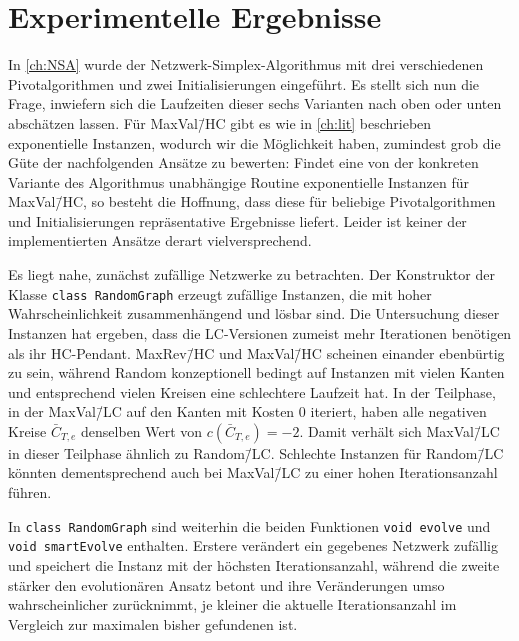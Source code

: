 \chapter{Experimentelle Ergebnisse}\label{ch:erg}
In \cref{ch:NSA} wurde der Netzwerk-Simplex-Algorithmus mit drei verschiedenen Pivotalgorithmen und zwei Initialisierungen eingeführt. Es stellt sich nun die Frage, inwiefern sich die Laufzeiten dieser sechs Varianten nach oben oder unten abschätzen lassen. Für MaxVal\=/HC gibt es wie in \cref{ch:lit} beschrieben exponentielle Instanzen, wodurch wir die Möglichkeit haben, zumindest grob die Güte der nachfolgenden Ansätze zu bewerten: Findet eine von der konkreten Variante des Algorithmus unabhängige Routine exponentielle Instanzen für MaxVal\=/HC, so besteht die Hoffnung, dass diese für beliebige Pivotalgorithmen und Initialisierungen repräsentative Ergebnisse liefert. Leider ist keiner der implementierten Ansätze derart vielversprechend.

Es liegt nahe, zunächst zufällige Netzwerke zu betrachten. Der Konstruktor der Klasse \lstinline|class RandomGraph| erzeugt zufällige Instanzen, die mit hoher Wahrscheinlichkeit zusammenhängend und lösbar sind. Die Untersuchung dieser Instanzen hat ergeben, dass die LC-Versionen zumeist mehr Iterationen benötigen als ihr HC-Pendant. MaxRev\=/HC und MaxVal\=/HC scheinen einander ebenbürtig zu sein, während Random konzeptionell bedingt auf Instanzen mit vielen Kanten und entsprechend vielen Kreisen eine schlechtere Laufzeit hat. In der Teilphase, in der MaxVal\=/LC auf den Kanten mit Kosten $0$ iteriert, haben alle negativen Kreise $\bar{C}_{T,e}$ denselben Wert von $c(\bar{C}_{T,e})=-2$. Damit verhält sich MaxVal\=/LC in dieser Teilphase ähnlich zu Random\=/LC. Schlechte Instanzen für Random\=/LC könnten dementsprechend auch bei MaxVal\=/LC zu einer hohen Iterationsanzahl führen.

In \lstinline|class RandomGraph| sind weiterhin die beiden Funktionen \lstinline|void evolve| und \lstinline|void smartEvolve| enthalten. Erstere verändert ein gegebenes Netzwerk zufällig und speichert die Instanz mit der höchsten Iterationsanzahl, während die zweite stärker den evolutionären Ansatz betont und ihre Veränderungen umso wahrscheinlicher zurücknimmt, je kleiner die aktuelle Iterationsanzahl im Vergleich zur maximalen bisher gefundenen ist.

